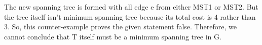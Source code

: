 \documentclass[11pt]{article}
\begin{document}
\begin {center}
\end{center}
\newline The new spanning tree is formed with all edge e from either MST1 or MST2. But the tree itself isn't minimum spanning tree because its total cost is 4 rather than 3. So, this counter-example proves the given statement false. 
\newline 
\newline Therefore, we cannot conclude that T itself must be a minimum spanning tree in G. 
\end{document}
